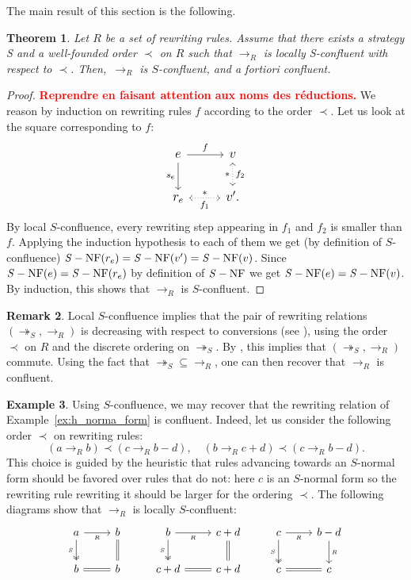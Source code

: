\documentclass[10pt]{easychair}
\newtheorem{theorem}{Theorem}[section]
\theoremstyle{definition}
\newtheorem{remark}[theorem]{Remark}
\newtheorem{example}[theorem]{Example}
\newcommand\todo[1]{{\bf\textcolor{red}{#1}}}
\newcommand\rewR{\to_R}
\newcommand\rewS{\twoheadrightarrow_S}
\DeclareMathOperator{\SNF}{{\it S}-NF}
\begin{document}
The main result of this section is the following.
\medskip

\begin{theorem}\label{thm:confluence_criterion}
  Let $R$ be a set of rewriting rules. Assume that there exists a
  strategy S and a well-founded order $\prec$ on $R$ such that $\rewR$ is
  locally S-confluent with respect to $\prec$. Then,~$\rewR$ is
  $S$-confluent, and \emph{a fortiori} confluent. 
\end{theorem}

\begin{proof}
  \todo{Reprendre en faisant attention aux noms des réductions.}
  We reason by induction on rewriting rules $f$ according to the order
  $\prec$. Let us look at the square corresponding to $f$:
  \[\large\begin{tikzcd}
  e\ar[r, "f"]\ar[d, "s_e"'] & v\ar[d, leftrightarrow, dotted, "*"', "f_2"]\\
  r_e\ar[r, leftrightarrow, dotted, "*", "f_1"'] & v'.
  \end{tikzcd}\]
  By local $S$-confluence, every rewriting step appearing
  in $f_1$ and $f_2$ is smaller than $f$.
  Applying the induction hypothesis to each of them we get
  (by definition of $S$-confluence) $\SNF(r_e) = \SNF(v') = \SNF(v)$.
  Since $\SNF(e) = \SNF(r_e)$ by definition of $\SNF$ we get
  $\SNF(e) = \SNF(v)$. By induction, this shows that $\rewR$ is
  $S$-confluent.
\end{proof}
\medskip

\begin{remark}
  Local $S$-confluence implies that the pair of rewriting relations
  $(\rewS,\rewR)$ is decreasing with respect to conversions (see
  \cite[Definition 3]{van2008confluence}), using the order $\prec$ on $R$
  and the discrete ordering on $\rewS$. By
  \cite[Theorem 3]{van2008confluence}, this implies that $(\rewS,\rewR)$
  commute. Using the fact that $\rewS \subseteq \rewR$, one can then
  recover that $\rewR$ is confluent.
\end{remark}
\smallskip

\begin{example}\label{ex:end_to_example}
  Using $S$-confluence, we may recover that the rewriting relation of
  Example~\ref{ex:h_norma_form} is confluent. Indeed, let us consider the
  following order $\prec$ on rewriting rules:
  \[(a\rewR b)\prec(c\rewR b-d),\quad(b\rewR c+d)\prec(c\rewR b-d).\]
  This choice is guided by the heuristic that rules advancing towards an
  $S$-normal form should be favored over rules that do not: here $c$ is
  an $S$-normal form so the rewriting rule rewriting it should be larger
  for the ordering $\prec$.
  The following diagrams show that $\rewR$ is locally $S$-confluent:
  \[\begin{tikzcd}
  a\ar[r, "_R"']\ar[d, twoheadrightarrow, "_S"'] & b\ar[d, equal] & b\ar[r, "_R"']
  \ar[d, twoheadrightarrow, "_S"'] & c+d\ar[d, equal] & c\ar[r, "_R"']\ar[d,
    twoheadrightarrow, "_S"'] & b-d\ar[d, "_R"]\\
  b\ar[r, equal] & b & c+d\ar[r, equal] & c+d & c\ar[r, equal] & c
  \end{tikzcd}\]
\end{example}
\smallskip
\end{document}
